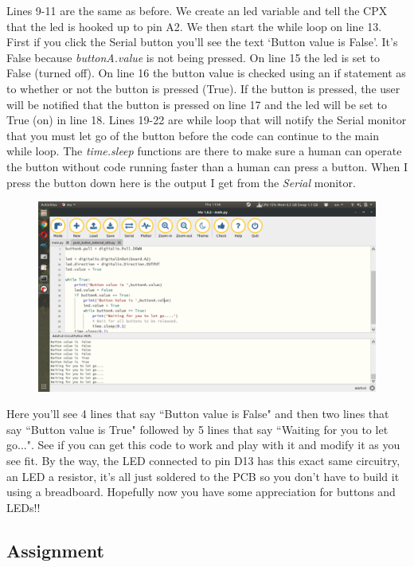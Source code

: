 Lines 9-11 are the same as before. We create an led variable and tell
the CPX that the led is hooked up to pin A2. We then start the while
loop on line 13. First if you click the Serial button you’ll see the
text ‘Button value is False’. It’s False because {\it buttonA.value} is not
being pressed. On line 15 the led is set to False (turned off). On
line 16 the button value is checked using an if statement as to
whether or not the button is pressed (True). If the button is pressed,
the user will be notified that the button is pressed on line 17 and
the led will be set to True (on) in line 18. Lines 19-22 are while
loop that will notify the Serial monitor that you must let go of the
button before the code can continue to the main while loop. The
{\it time.sleep} functions are there to make sure a human can operate the
button without code running faster than a human can press a
button. When I press the button down here is the output I get from the
{\it Serial} monitor. 
\begin{figure}[H]
  \begin{center}
    \includegraphics[width=\textwidth]{Figures/MuButton.png}
  \end{center}
\end{figure}
Here you’ll see 4 lines that say ``Button value is False" and then two
lines that say ``Button value is True" followed by 5 lines that say
``Waiting for you to let go...". See if you can get this code to work and
play with it and modify it as you see fit. By the way, the LED
connected to pin D13 has this exact same circuitry, an LED a resistor,
it’s all just soldered to the PCB so you don’t have to build it using
a breadboard. Hopefully now you have some appreciation for buttons and
LEDs!! 

\subsection{Assignment}

